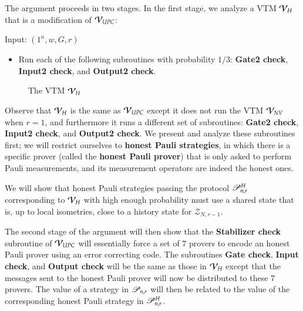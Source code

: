 The argument proceeds in two stages. In the first stage, we analyze a VTM $\mathcal V_H$ that is a modification of $\mathcal V_{UPC}$: 

\begin{center}
\begin{mdframed}
    Input: $(1^n,w,G,r)$
    \begin{itemize}
    	\item Run each of the following subroutines with probability $1/3$: \textbf{Gate2 check}, \textbf{Input2 check}, and \textbf{Output2 check}.
		\end{itemize}
\end{mdframed}

\begin{figure}[H]
\caption{The VTM $\mathcal V_H$}
\label{fig:vtm_h}
\end{figure}
\end{center}

Observe that $\mathcal V_H$ is the same as $\mathcal V_{UPC}$ except it does not run the VTM $\mathcal V_{NV}$ when $r = 1$, and furthermore it runs a different set of subroutines: \textbf{Gate2 check}, \textbf{Input2 check}, and \textbf{Output2 check}. We present and analyze these subroutines first; we will restrict ourselves to \textbf{honest Pauli strategies}, in which there is a specific prover (called the \textbf{honest Pauli prover}) that is only asked to perform Pauli measurements, and its measurement operators are indeed the honest ones.

We will show that honest Pauli strategies passing the protocol $\mathscr{P}^H_{n,r}$ corresponding to $\mathcal V_H$ with high enough probability must use a shared state that is, up to local isometries, close to a history state for $\mathscr{Z}_{N,r-1}$.

The second stage of the argument will then show that the \textbf{Stabilizer check} subroutine of $\mathcal V_{UPC}$ will essentially force a set of $7$ provers  to encode an honest Pauli prover using an error correcting code. The subroutines \textbf{Gate check}, \textbf{Input check}, and \textbf{Output check} will be the same as those in $\mathcal V_H$ except that the messages sent to the honest Pauli prover will now be distributed to these $7$ provers. The value of a strategy in $\mathscr{P}_{n,r}$ will then be related to the value of the corresponding honest Pauli strategy in $\mathscr{P}^H_{n,r}$.


